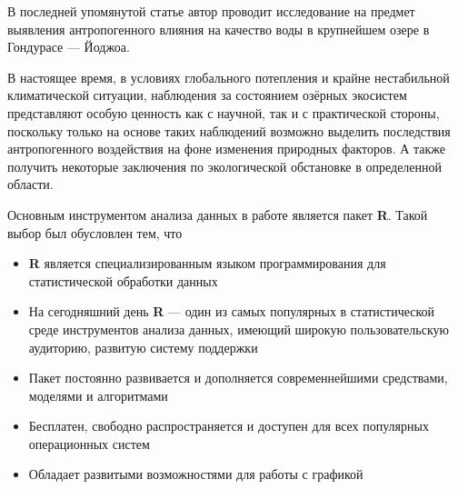В последней упомянутой статье \cite{Chokshi2006} автор проводит исследование на предмет выявления антропогенного влияния на качество воды в крупнейшем озере в Гондурасе --- Йоджоа.

В настоящее время, в условиях глобального потепления и крайне нестабильной климатической ситуации, наблюдения за состоянием озёрных экосистем представляют особую ценность как с научной, так и с практической стороны, поскольку только на основе таких наблюдений возможно выделить последствия антропогенного воздействия на фоне изменения природных факторов. А также получить некоторые заключения по экологической обстановке в определенной области.

Основным инструментом анализа данных в работе является пакет \textbf{R}. Такой выбор был обусловлен тем, что
\begin{itemize}
  \item \textbf{R} является специализированным языком программирования для статистической обработки данных
  \item На сегодняшний день \textbf{R} --- один из самых популярных в статистической среде инструментов анализа данных, имеющий широкую пользовательскую аудиторию, развитую систему поддержки
  \item Пакет постоянно развивается и дополняется современнейшими средствами, моделями и алгоритмами
  \item Бесплатен, свободно распространяется и доступен для всех популярных операционных систем
  \item Обладает развитыми возможностями для работы с графикой
\end{itemize}